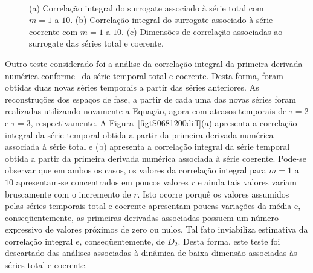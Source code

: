 \begin{figure}[ht]
\centering {}\\ 
\caption{(a) Correlação integral do surrogate associado à série total com $m=1$ a $10$. (b) Correlação integral do surrogate associado à série coerente com $m=1$ a $10$. (c) Dimensões de correlação associadas ao surrogate das séries total e coerente.}
\label{figtS0681200surr}
\end{figure}

Outro teste considerado foi a análise da correlação integral da primeira derivada numérica conforme~ da série temporal total e coerente. Desta forma, foram obtidas duas novas séries temporais a partir das séries anteriores. As reconstruções dos espaços de fase, a partir de cada uma das novas séries foram realizadas utilizando novamente a Equação,%
agora com atrasos temporais de $\tau=2$ e $\tau=3$, respectivamente. A Figura~\ref{figtS0681200diff}(a) apresenta a correlação integral da série temporal obtida a partir da primeira derivada numérica associada à série total e (b) apresenta a correlação integral da série temporal obtida a partir da primeira derivada numérica associada à série coerente. Pode-se observar que em ambos os casos, os valores da correlação integral para $m=1$ a $10$ apresentam-se concentrados em poucos valores $r$ e ainda tais valores variam bruscamente com o incremento de $r$. Isto ocorre porquê os valores assumidos pelas séries temporais total e coerente apresentam poucas variações da média e, conseqüentemente, as primeiras derivadas associadas possuem um número expressivo de valores próximos de zero ou nulos. Tal fato inviabiliza estimativa da correlação integral e, conseqüentemente, de $D_{2}$. Desta forma, este teste foi descartado das análises associadas à dinâmica de baixa dimensão associadas às séries total e coerente.

